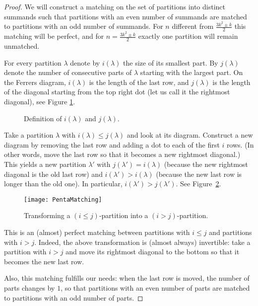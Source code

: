 \begin{proof}
We will construct a matching on the set of partitions into distinct summands
such that partitions with an even number of summands are matched to partitions with an odd number of summands.
For $n$ different from $\frac{3k^2 \pm k}2$ this matching will be perfect,
and for $n = \frac{3k^2 \pm k}2$ exactly one partition will remain unmatched.

For every partition $\lambda$ denote by $i(\lambda)$ the size of its smallest part.
By $j(\lambda)$ denote the number of consecutive parts of $\lambda$ starting with the largest part.
On the Ferrers diagram, $i(\lambda)$ is the length of the last row,
and $j(\lambda)$ is the length of the diagonal starting from the top right dot (let us call it the rightmost diagonal),
see Figure \ref{fig:IandJ}.

\begin{figure}[ht]
\begin{center}

\end{center}
\caption{Definition of $i(\lambda)$ and $j(\lambda)$.}
\label{fig:IandJ}
\end{figure}

Take a partition $\lambda$ with $i(\lambda) \le j(\lambda)$ and look at its diagram.
Construct a new diagram by removing the last row and adding a dot to each of the first $i$ rows.
(In other words, move the last row so that it becomes a new rightmost diagonal.)
This yields a new partition $\lambda'$ with $j(\lambda') = i(\lambda)$ (because the new rightmost diagonal is the old last row)
and $i(\lambda') > i(\lambda)$ (because the new last row is longer than the old one).
In particular, $i(\lambda') > j(\lambda')$.
See Figure~\ref{fig:PentaMatching}.

\begin{figure}[ht]
\begin{center}
\texttt{[image: PentaMatching]}
\end{center}
\caption{Transforming a $(i \le j)$-partition into a $(i > j)$-partition.}
\label{fig:PentaMatching}
\end{figure}

This is an (almost) perfect matching between partitions with $i \le j$ and partitions with $i > j$.
Indeed, the above transformation is (almost always) invertible:
take a partition with $i > j$ and move its rightmost diagonal to the bottom so that it becomes the new last row.

Also, this matching fulfills our needs: when the last row is moved, the number of parts changes by $1$,
so that partitions with an even number of parts are matched to partitions with an odd number of parts.


\end{proof}
